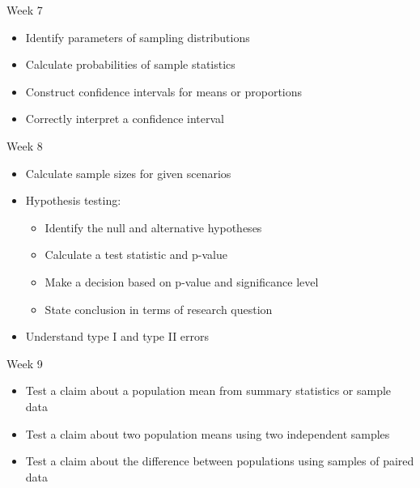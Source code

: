 \documentclass[xcolor=table, aspectratio=169, bigger]{beamer}
\begin{document}
\begin{frame}{Week 7}
\begin{block}{}
\begin{itemize}
\item Identify parameters of sampling distributions
\item Calculate probabilities of sample statistics
\item Construct confidence intervals for means or proportions
\item Correctly interpret a confidence interval
\end{itemize}
\end{block}
\end{frame}

\begin{frame}{Week 8}
\begin{block}{}
\begin{itemize}
\item Calculate sample sizes for given scenarios
\item Hypothesis testing:
\begin{itemize}
\item Identify the null and alternative hypotheses
\item Calculate a test statistic and p-value
\item Make a decision based on p-value and significance level
\item State conclusion in terms of research question
\end{itemize}
\item Understand type I and type II errors
\end{itemize}
\end{block}
\end{frame}

\begin{frame}{Week 9}
\begin{block}{}
\begin{itemize}
\item Test a claim about a population mean from summary statistics or sample data
\item Test a claim about two population means using two independent samples
\item Test a claim about the difference between populations using samples of paired data
\end{itemize}
\end{block}
\end{frame}
\end{document}
